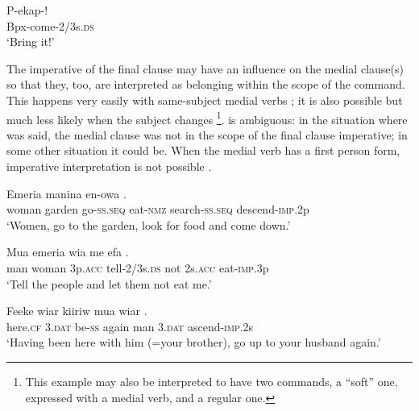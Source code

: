 \ea%
\label{ex:x1084}
\gll P-ekap-! \\
Bpx-come-2/3s.\textsc{ds}      \\
\glt `Bring it!'
\z

The imperative of the final clause may have an influence on the medial clause(s) so that they, too, are interpreted as belonging within the scope of the command. This happens very easily with same-subject medial verbs ; it is also possible but much less likely when the subject changes \footnote{This example may also be interpreted to have two commands, a ``soft'' one, expressed with a medial verb, and a regular one.}.  is ambiguous: in the situation where was said, the medial clause was not in the scope of the final clause imperative; in some other situation it could be. When the medial verb has a first person form, imperative interpretation is not possible . 

\ea%
\label{ex:x1082}
\gll Emeria  manina    en-owa    . \\
woman  garden  go-\textsc{ss}.\textsc{seq}  eat-\textsc{nmz}  search-\textsc{ss}.\textsc{seq}  descend-\textsc{imp}.2p      \\
\glt `Women, go to the garden, look for food and come down.'
\z





\ea%
\label{ex:x1364}
\gll Mua  emeria  wia    me  efa  . \\
man  woman  3p.\textsc{acc}  tell-2/3s.\textsc{ds}  not  2s.\textsc{acc}  eat-\textsc{imp}.3p      \\
\glt `Tell the people and let them not eat me.'
\z





\ea%
\label{ex:x1846}
\gll Feeke  wiar    kiiriw  mua  wiar  . \\
here.\textsc{cf}  3.\textsc{dat}  be-\textsc{ss}  again  man  3.\textsc{dat}  ascend-\textsc{imp}.2s      \\
\glt `Having been here with him (=your brother), go up to your husband again.'
\z





